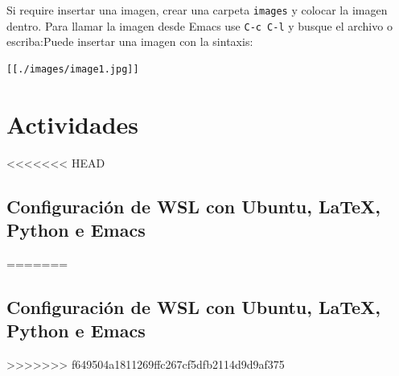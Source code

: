 \documentclass{article}
\begin{document}
Si require insertar una imagen, crear una carpeta \texttt{images} y colocar
la imagen dentro. Para llamar la imagen desde Emacs use \texttt{C-c C-l} y
busque el archivo o escriba:Puede insertar una imagen con la sintaxis:

\begin{verbatim}
[[./images/image1.jpg]]
\end{verbatim}
\section{Actividades}
<<<<<<< HEAD
\label{sec:orgf796ef3}
\subsection{Configuración de WSL con Ubuntu, \LaTeX, Python e Emacs}
\label{sec:org72c32f0}
=======
\label{sec:org43fe956}
\subsection{Configuración de WSL con Ubuntu, \LaTeX, Python e Emacs}
\label{sec:orgeaeac51}
>>>>>>> f649504a1811269ffc267cf5dfb2114d9d9af375
\end{document}
